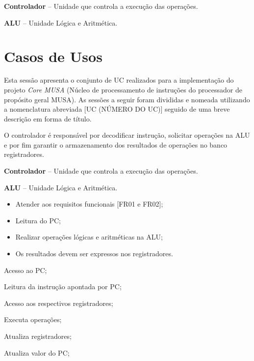 \documentclass{article}
\begin{document}
\textbf{Controlador} – Unidade que controla a execução das operações.

\textbf{ALU} – Unidade L\'{o}gica e Aritm\'{e}tica.
  
  \section{Casos de Usos}
  Esta sessão apresenta o conjunto de UC realizados para a implementação do projeto \textit{Core MUSA} (Núcleo de processamento de instruções do processador de propósito geral MUSA). As sessões a seguir foram divididas e nomeada utilizando a nomenclatura abreviada [UC (NÚMERO DO UC)] seguido de uma breve descrição em forma de título.

  O controlador é responsável por decodificar instrução, solicitar operações na ALU e por fim garantir o armazenamento dos resultados de operações no banco registradores.
  
  \actors
    \begin{description}
     \item \textbf{Controlador} – Unidade que controla a execução das operações.
     \item \textbf{ALU} – Unidade L\'{o}gica e Aritm\'{e}tica.
    \end{description}
    
  \preconditions 
    \begin{itemize}
     \item Atender aos requisitos funcionais [FR01 e FR02];
     \item Leitura do PC;
     \item Realizar operações lógicas e aritméticas na ALU;
    \end{itemize}

  \postconditions
    \begin{itemize}
     \item Os resultados devem ser expressos nos registradores.
    \end{itemize}
  
  
  \begin{mainflow}
    \item Acesso ao PC;
    \item Leitura da instrução apontada por PC;
    \item Acesso aos respectivos registradores;
    \item Executa operações;
    \item Atualiza registradores;
    \item Atualiza valor do PC;
  \end{mainflow}
\end{document}
